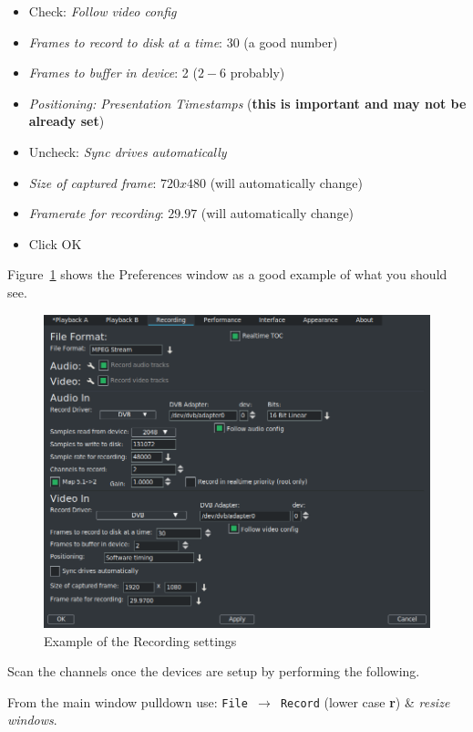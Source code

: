 \begin{enumerate}
\begin{itemize}
        \item Check: \textit{Follow video config}
        \item \textit{Frames to record to disk at a time}: 30 (a good number)
        \item \textit{Frames to buffer in device}: 2 ($2-6$ probably)
        \item \textit{Positioning: Presentation Timestamps} (\textbf{this is important and may not be already set})
        \item Uncheck: \textit{Sync drives automatically}
        \item \textit{Size of captured frame}: $720x480$ (will automatically change)
        \item \textit{Framerate for recording}: $29.97$ (will automatically change)
        \item Click OK
    \end{itemize}
\end{enumerate}

Figure~\ref{fig:recording03} shows the Preferences window as a good example of what you should see.

\begin{figure}[htpb]
    \centering
    \includegraphics[width=0.99\linewidth]{images/recording03.png}
    \caption{Example of the Recording settings}
    \label{fig:recording03}
\end{figure}

Scan the channels once the devices are setup by performing the following.

From the main window pulldown use:  \texttt{File $\rightarrow$ Record}  (lower case \textbf{r}) \& \textit{resize windows}.


